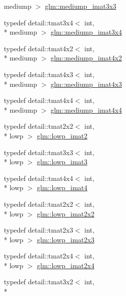 \begin{DoxyCompactItemize}
mediump $>$ \hyperlink{group__gtc__matrix__integer_gac5ee8dc182055bb0a00a90c031d4a714}{glm\-::mediump\-\_\-imat3x3}
\item 
typedef detail\-::tmat3x4$<$ int, \\*
mediump $>$ \hyperlink{group__gtc__matrix__integer_gaaac79be4db34dde570c3331ffe728d55}{glm\-::mediump\-\_\-imat3x4}
\item 
typedef detail\-::tmat4x2$<$ int, \\*
mediump $>$ \hyperlink{group__gtc__matrix__integer_gacdae7d6ae4820756c62c2b5fd5c0370a}{glm\-::mediump\-\_\-imat4x2}
\item 
typedef detail\-::tmat4x3$<$ int, \\*
mediump $>$ \hyperlink{group__gtc__matrix__integer_ga5032ee978a55aa0db4842d5c3cbeade0}{glm\-::mediump\-\_\-imat4x3}
\item 
typedef detail\-::tmat4x4$<$ int, \\*
mediump $>$ \hyperlink{group__gtc__matrix__integer_gafa2df6be3aad055867b9bfea34e9c4a0}{glm\-::mediump\-\_\-imat4x4}
\item 
typedef detail\-::tmat2x2$<$ int, \\*
lowp $>$ \hyperlink{group__gtc__matrix__integer_gae0df4bc278c1a958a32af9ac82c47630}{glm\-::lowp\-\_\-imat2}
\item 
typedef detail\-::tmat3x3$<$ int, \\*
lowp $>$ \hyperlink{group__gtc__matrix__integer_ga149b90591e7275193c85cc08acbf0024}{glm\-::lowp\-\_\-imat3}
\item 
typedef detail\-::tmat4x4$<$ int, \\*
lowp $>$ \hyperlink{group__gtc__matrix__integer_ga7c687f14d923e05d5cf14aac41d10993}{glm\-::lowp\-\_\-imat4}
\item 
typedef detail\-::tmat2x2$<$ int, \\*
lowp $>$ \hyperlink{group__gtc__matrix__integer_ga05307630bc68a62132a82d1886a0b5e2}{glm\-::lowp\-\_\-imat2x2}
\item 
typedef detail\-::tmat2x3$<$ int, \\*
lowp $>$ \hyperlink{group__gtc__matrix__integer_ga5757953c508a6e05bf3573d6c099cf88}{glm\-::lowp\-\_\-imat2x3}
\item 
typedef detail\-::tmat2x4$<$ int, \\*
lowp $>$ \hyperlink{group__gtc__matrix__integer_ga4d859ef48cdfb15b2c9acc98064dd272}{glm\-::lowp\-\_\-imat2x4}
\item 
typedef detail\-::tmat3x2$<$ int, \\*

\end{DoxyCompactItemize}
